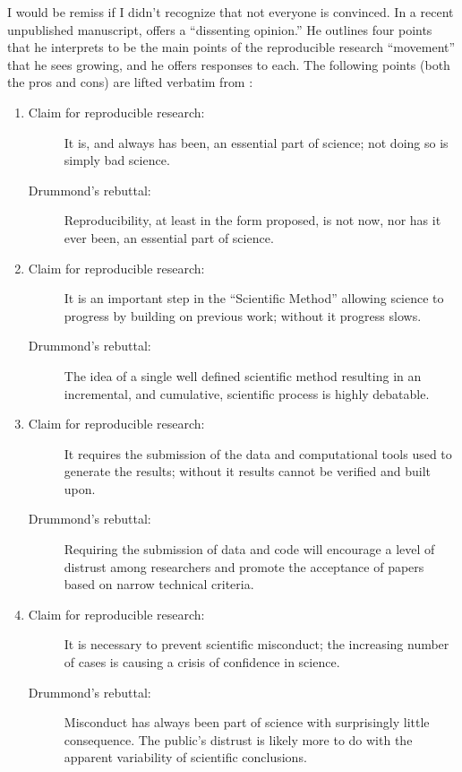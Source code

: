 \documentclass{book}
\begin{document}
I would be remiss if I didn't recognize that not everyone is convinced. In a recent unpublished manuscript, \textcite{drummond2012reproducible} offers a ``dissenting opinion.'' He outlines four points that he interprets to be the main points of the reproducible research ``movement'' that he sees growing, and he offers responses to each. The following points (both the pros and cons) are lifted verbatim from \textcite[][p.2--3]{drummond2012reproducible}:

\begin{enumerate}
\item 
\begin{description}
\item[Claim for reproducible research:] It is, and always has been, an essential part of science; not doing so is simply bad science.
\item[Drummond's rebuttal:] Reproducibility, at least in the form proposed, is not now, nor has it ever been, an essential part of science.
\end{description}
\item 
\begin{description}
\item[Claim for reproducible research:] It is an important step in the ``Scientific Method'' allowing science to progress by building on previous work; without it progress slows.
\item[Drummond's rebuttal:] The idea of a single well defined scientific method resulting in an incremental, and cumulative, scientific process is highly debatable.
\end{description}
\item 
\begin{description}
\item[Claim for reproducible research:] It requires the submission of the data and computational tools used to generate the results; without it results cannot be verified and built upon.
\item[Drummond's rebuttal:] Requiring the submission of data and code will encourage a level of distrust among researchers and promote the acceptance of papers based on narrow technical criteria.
\end{description}
\item 
\begin{description}
\item[Claim for reproducible research:] It is necessary to prevent scientific misconduct; the increasing number of cases is causing a crisis of confidence in science.
\item[Drummond's rebuttal:] Misconduct has always been part of science with surprisingly little consequence. The public's distrust is likely more to do with the apparent variability of scientific conclusions.
\end{description}
\end{enumerate}
\end{document}
